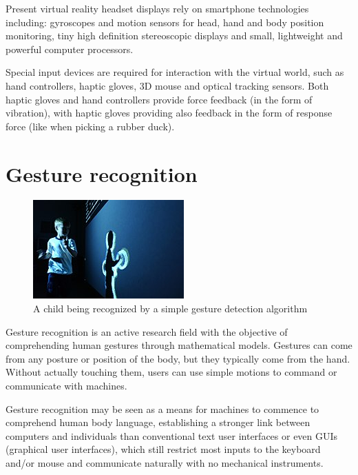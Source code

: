 \documentclass[12pt,a4paper,twoside]{report}
\begin{document}
Present virtual reality headset displays rely on smartphone technologies including: gyroscopes and motion sensors for head, hand and body position monitoring, tiny high definition stereoscopic displays and small, lightweight and powerful computer processors.

Special input devices are required for interaction with the virtual world, such as hand controllers, haptic gloves, 3D mouse and optical tracking sensors. Both haptic gloves and hand controllers provide force feedback (in the form of vibration), with haptic gloves providing also feedback in the form of response force (like when picking a rubber duck).

\section{Gesture recognition}

\begin{figure}
  \includegraphics[width=\linewidth]{img/GestRecog_child.jpg}
  \caption[]{A child being recognized by a simple gesture detection algorithm \footnotemark }
  \label{fig:child}
\end{figure}


Gesture recognition is an active research field with the objective of comprehending human gestures through mathematical models. Gestures can come from any posture or position of the body, but they typically come from the hand. Without actually touching them, users can use simple motions to command or communicate with machines.

Gesture recognition may be seen as a means for machines to commence to comprehend human body language, establishing a stronger link between computers and individuals than conventional text user interfaces or even GUIs (graphical user interfaces), which still restrict most inputs to the keyboard and/or mouse and communicate naturally with no mechanical instruments.
\end{document}
